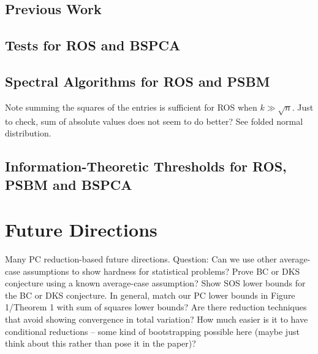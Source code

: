 \documentclass[11pt]{article}
\begin{document}
\subsection{Previous Work}

\subsection{Tests for ROS and BSPCA}

\subsection{Spectral Algorithms for ROS and PSBM}

Note summing the squares of the entries is sufficient for ROS when $k \gg \sqrt{n}$. Just to check, sum of absolute values does not seem to do better? See folded normal distribution.

\subsection{Information-Theoretic Thresholds for ROS, PSBM and BSPCA}

\section{Future Directions}

Many PC reduction-based future directions. Question: Can we use other average-case assumptions to show hardness for statistical problems? Prove BC or DKS conjecture using a known average-case assumption? Show SOS lower bounds for the BC or DKS conjecture. In general, match our PC lower bounds in Figure 1/Theorem 1 with sum of squares lower bounds? Are there reduction techniques that avoid showing convergence in total variation? How much easier is it to have conditional reductions -- some kind of bootstrapping possible here (maybe just think about this rather than pose it in the paper)?
\end{document}
